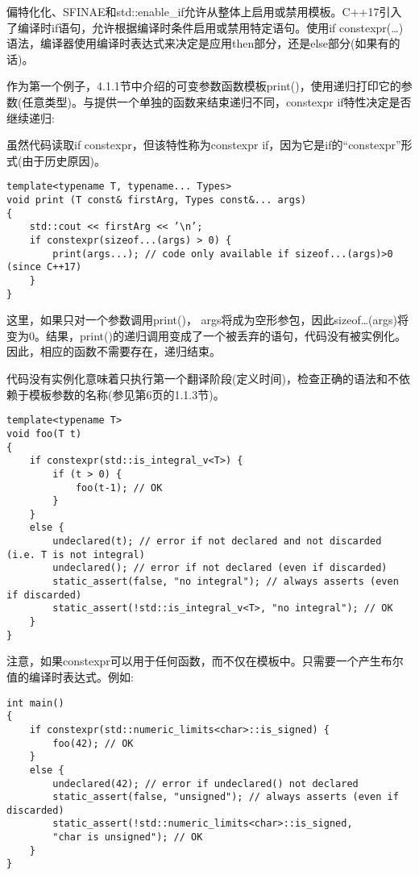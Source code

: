 偏特化化、SFINAE和std::enable\_if允许从整体上启用或禁用模板。C++17引入了编译时if语句，允许根据编译时条件启用或禁用特定语句。使用if constexpr(…)语法，编译器使用编译时表达式来决定是应用then部分，还是else部分(如果有的话)。

作为第一个例子，4.1.1节中介绍的可变参数函数模板print()，使用递归打印它的参数(任意类型)。与提供一个单独的函数来结束递归不同，constexpr if特性决定是否继续递归:

\begin{tcolorbox}[colback=webgreen!5!white,colframe=webgreen!75!black]
\hspace*{0.75cm}虽然代码读取if constexpr，但该特性称为constexpr if，因为它是if的“constexpr”形式(由于历史原因)。
\end{tcolorbox}

\begin{lstlisting}[style=styleCXX]
template<typename T, typename... Types>
void print (T const& firstArg, Types const&... args)
{
	std::cout << firstArg << ’\n’;
	if constexpr(sizeof...(args) > 0) {
		print(args...); // code only available if sizeof...(args)>0 (since C++17)
	}
}
\end{lstlisting}

这里，如果只对一个参数调用print()， args将成为空形参包，因此sizeof…(args)将变为0。结果，print()的递归调用变成了一个被丢弃的语句，代码没有被实例化。因此，相应的函数不需要存在，递归结束。

代码没有实例化意味着只执行第一个翻译阶段(定义时间)，检查正确的语法和不依赖于模板参数的名称(参见第6页的1.1.3节)。

\begin{lstlisting}[style=styleCXX]
template<typename T>
void foo(T t)
{
	if constexpr(std::is_integral_v<T>) {
		if (t > 0) {
			foo(t-1); // OK
		}
	}
	else {
		undeclared(t); // error if not declared and not discarded (i.e. T is not integral)
		undeclared(); // error if not declared (even if discarded)
		static_assert(false, "no integral"); // always asserts (even if discarded)
		static_assert(!std::is_integral_v<T>, "no integral"); // OK
	}
}
\end{lstlisting}

注意，如果constexpr可以用于任何函数，而不仅在模板中。只需要一个产生布尔值的编译时表达式。例如:

\begin{lstlisting}[style=styleCXX]
int main()
{
	if constexpr(std::numeric_limits<char>::is_signed) {
		foo(42); // OK
	}
	else {
		undeclared(42); // error if undeclared() not declared
		static_assert(false, "unsigned"); // always asserts (even if discarded)
		static_assert(!std::numeric_limits<char>::is_signed,
		"char is unsigned"); // OK
	}
}
\end{lstlisting}

